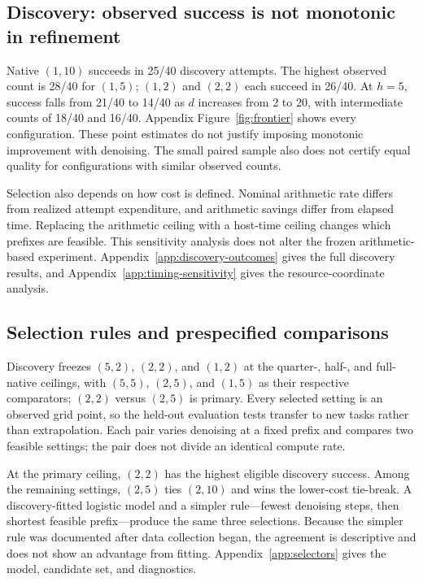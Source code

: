 \documentclass{article}
\begin{document}
\subsection{Discovery: observed success is not monotonic in refinement}
\label{sec:discovery-quality}

Native $(1,10)$ succeeds in 25/40 discovery attempts. The highest observed count
is 28/40 for $(1,5)$; $(1,2)$ and $(2,2)$ each succeed in 26/40. At $h=5$,
success falls from 21/40 to 14/40 as $d$ increases from 2 to 20, with intermediate
counts of 18/40 and 16/40.
Appendix Figure~\ref{fig:frontier} shows every configuration.
These point estimates do not justify imposing monotonic improvement with
denoising. The small paired sample also does not certify equal quality for
configurations with similar observed counts.

Selection also depends on how cost is defined. Nominal arithmetic rate differs
from realized attempt expenditure, and arithmetic savings differ from elapsed
time. Replacing the arithmetic ceiling with a host-time ceiling changes which
prefixes are feasible. This sensitivity analysis does not alter the frozen
arithmetic-based experiment. Appendix~\ref{app:discovery-outcomes} gives the
full discovery results, and Appendix~\ref{app:timing-sensitivity} gives the
resource-coordinate analysis.

\subsection{Selection rules and prespecified comparisons}
\label{sec:prediction}

Discovery freezes $(5,2)$, $(2,2)$, and $(1,2)$ at the quarter-, half-, and
full-native ceilings, with $(5,5)$, $(2,5)$, and $(1,5)$ as their respective
comparators; $(2,2)$ versus $(2,5)$ is primary. Every selected setting is an
observed grid point, so the held-out evaluation tests transfer to new tasks rather than
extrapolation. Each pair varies denoising at a fixed prefix and compares two
feasible settings; the pair does not divide an identical compute rate.

At the primary ceiling, $(2,2)$ has the highest eligible discovery success.
Among the remaining settings, $(2,5)$ ties $(2,10)$ and wins the lower-cost
tie-break. A discovery-fitted logistic model and a simpler rule---fewest
denoising steps, then shortest feasible prefix---produce the same three
selections. Because the simpler rule was documented after data collection
began, the agreement is descriptive and does not show an advantage from fitting.
Appendix~\ref{app:selectors} gives the model, candidate set, and diagnostics.
\end{document}
